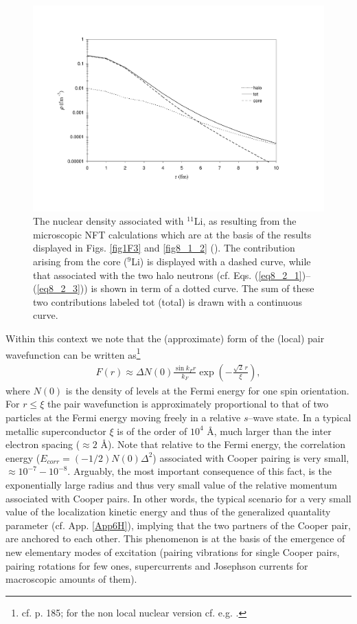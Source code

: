 \begin{figure}
\centerline{\includegraphics*[width=15cm,angle=0]{nutshell/figs/fig3_2_2.pdf}}
\caption{The nuclear density associated with $^{11}$Li, as resulting from the microscopic NFT calculations which are at the basis of the results displayed in Figs. \ref{fig1F3} and \ref{fig8_1_2} (\cite{Barranco:01}). The contribution arising from the core ($^{9}$Li) is displayed with a dashed curve, while that associated with the two halo neutrons (cf. Eqs. (\ref{eq8_2_1})--(\ref{eq8_2_3})) is shown in term of a dotted curve. The sum of these two contributions  labeled tot (total) is drawn with a continuous curve.}\label{fig3.2.2}
\end{figure}
Within this context we note that the (approximate) form of the (local) pair wavefunction can be written as\footnote{cf. \cite{Leggett:06} p. 185; for the non local nuclear version cf. e.g. \cite{Broglia:83c}.}
\begin{align}
F(r)\approx\Delta N(0)\frac{\sin k_F r}{k_F}\exp\left(-\frac{\sqrt{2}\,r}{\xi}\right),
\end{align}
where $N(0)$ is the density of levels at the Fermi energy for one spin orientation. For $r\leq\xi$ the pair wavefunction is approximately proportional to that of two particles at the Fermi energy moving freely in a relative $s$--wave state. In a typical metallic superconductor $\xi$ is of the order of $10^4$ \AA, much larger than the inter electron spacing ($\approx 2$ \AA). Note that relative to the Fermi energy, the correlation energy ($E_{corr}=(-1/2)N(0)\Delta^2$) associated with Cooper pairing is very small, $\approx 10^{-7}-10^{-8}$. Arguably, the most important consequence of this fact, is the exponentially large radius and thus very small value of the relative momentum associated with Cooper pairs. In other words, the typical scenario for a very small value of the localization kinetic energy and thus of the generalized quantality parameter (cf. App. \ref{App6H}), implying that the two partners of the Cooper pair, are  anchored to each other. This phenomenon is at the basis  of the emergence of new elementary modes of excitation (pairing vibrations for single Cooper pairs, pairing rotations for few ones, supercurrents and Josephson currents for macroscopic amounts of them).




